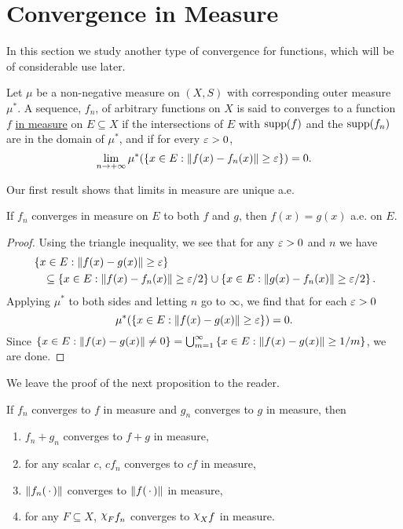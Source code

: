 \section{Convergence in Measure}

In this section we study another type of convergence for functions, which will be of considerable use later.
\begin{definition}
Let $\mu$ be a non-negative measure on $(X,S)$ with corresponding outer measure $\mu^*$. A sequence, $f_n$, of arbitrary functions on $X$ is said to converges to a function $f$ \underline{in measure} on $E\subseteq X$ if the intersections of $E$ with $\operatorname{supp}(f)$ and the $\operatorname{supp}(f_n)$ are in the domain of $\mu^*$, and if for every $\varepsilon>0$, $$\lim_{n\to+\infty}\mu^*(\left\{x\in E:\norm{f(x)-f_n(x)}\geq\varepsilon\right\})=0.$$
\end{definition}

Our first result shows that limits in measure are unique a.e.

\begin{proposition}
\label{prop:uniqueness of in measure}
If $f_n$ converges in measure on $E$ to both $f$ and $g$, then $f(x)=g(x)$ a.e. on $E$.
\end{proposition}

\begin{proof}
Using the triangle inequality, we see that for any $\varepsilon>0$ and $n$ we have
\begin{align*}
&\left\{x \in E:\norm{f(x)-g(x)} \geq \varepsilon\right\} \\
&\quad\subseteq\left\{x \in E:\norm{f(x)-f_n(x)} \geq \varepsilon/2\right\} \cup\left\{x \in E:\norm{g(x)-f_n(x)} \geq \varepsilon/2\right\}.
\end{align*}
Applying $\mu^*$ to both sides and letting $n$ go to $\infty$, we find that for each $\varepsilon>0$ $$\mu^*(\left\{x\in E:\norm{f(x)-g(x)}\geq\varepsilon\right\})=0.$$ Since $\left\{x\in E:\norm{f(x)-g(x)}\neq0\right\}=\bigcup_{m=1}^\infty\left\{x\in E:\norm{f(x)-g(x)}\geq1/m\right\}$, we are done.
\end{proof}

We leave the proof of the next proposition to the reader.

\begin{proposition}
If $f_n$ converges to $f$ in measure and $g_n$ converges to $g$ in measure, then
\begin{enumerate}[label=\arabic*)]
    \item $f_n+g_n$ converges to $f+g$ in measure,
    \item for any scalar $c$, $cf_n$ converges to $cf$ in measure,
    \item $\norm{f_n(\,\cdot\,)}$ converges to $\norm{f(\,\cdot\,)}$ in measure,
    \item for any $F\subseteq X$, $\idf{F}f_n$ converges to $\idf{X}f$ in measure.
\end{enumerate}
\end{proposition}

